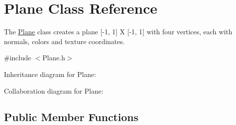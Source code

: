 \hypertarget{class_plane}{}\section{Plane Class Reference}
\label{class_plane}


The \hyperlink{class_plane}{Plane} class creates a plane \mbox{[}-\/1, 1\mbox{]} X \mbox{[}-\/1, 1\mbox{]} with four vertices, each with normals, colors and texture coordinates.  




{\ttfamily \#include $<$Plane.\+h$>$}



Inheritance diagram for Plane\+:


Collaboration diagram for Plane\+:
\subsection*{Public Member Functions}
